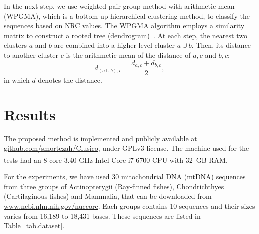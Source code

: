 \documentclass[extendedabs]{recpad2k}
\begin{document}
In the next step, we use weighted pair group method with arithmetic mean (WPGMA), which is a bottom-up hierarchical clustering method, to classify the sequences based on NRC values. The WPGMA algorithm employs a similarity matrix to construct a rooted tree (dendrogram)~\cite{sokal58a, clifford2011comparison}. At each step, the nearest two clusters $a$ and $b$ are combined into a higher-level cluster $a\cup b$. Then, its distance to another cluster $c$ is the arithmetic mean of the distance of $a, c$ and $b, c$:
\begin{equation}
   d_{(a\cup b), c} = \frac{d_{a, c} + d_{b, c}}{2},
\end{equation}
in which $d$ denotes the distance.


\section{Results}
The proposed method is implemented and publicly available at \url{github.com/smortezah/Clusico}, under GPLv3 license. The machine used for the tests had an 8-core 3.40 GHz Intel\textsuperscript{\scriptsize\textregistered} Core{\scriptsize\texttrademark} i7-6700 CPU with 32~GB RAM.

For the experiments, we have used 30 mitochondrial DNA (mtDNA) sequences from three groups of Actinopterygii (Ray-finned fishes), Chondrichthyes (Cartilaginous fishes) and Mammalia, that can be downloaded from \url{www.ncbi.nlm.nih.gov/nuccore}. Each groups contains 10 sequences and their sizes varies from 16,189 to 18,431 bases. These sequences are listed in Table~\ref{tab.dataset}.
\end{document}
